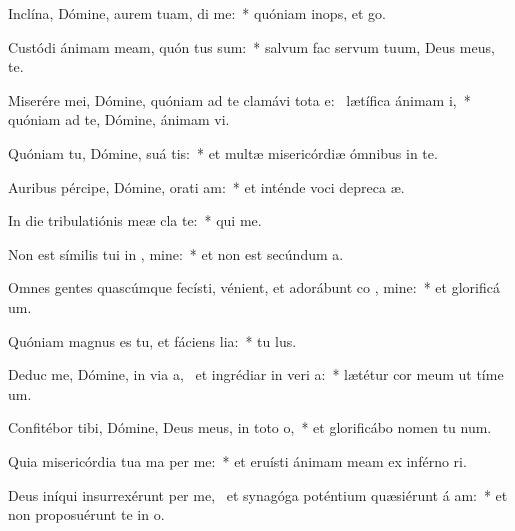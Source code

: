 \item Inclína, Dómine, aurem tuam,  di me:~* quóniam inops, et   go.
\item Custódi ánimam meam, quón tus sum:~* salvum fac servum tuum, Deus meus,   te.
\item Miserére mei, Dómine, quóniam ad te clamávi tota e:~\pscross{} lætífica ánimam  i,~* quóniam ad te, Dómine, ánimam  vi.
\item Quóniam tu, Dómine, suá  tis:~* et multæ misericórdiæ ómnibus in te.
\item Auribus pércipe, Dómine, orati am:~* et inténde voci depreca æ.
\item In die tribulatiónis meæ cla  te:~* qui  me.
\item Non est símilis tui in , mine:~* et non est secúndum  a.
\item Omnes gentes quascúmque fecísti, vénient, et adorábunt co , mine:~* et glorificá  um.
\item Quóniam magnus es tu, et fáciens lia:~* tu   lus.
\item Deduc me, Dómine, in via a,~\pscross{} et ingrédiar in veri a:~* lætétur cor meum ut tíme  um.
\item Confitébor tibi, Dómine, Deus meus, in toto  o,~* et glorificábo nomen tu  num.
\item Quia misericórdia tua ma  per me:~* et eruísti ánimam meam ex inférno ri.
\item Deus iníqui insurrexérunt per me,~\pscross{} et synagóga poténtium quæsiérunt á am:~* et non proposuérunt te in  o.
